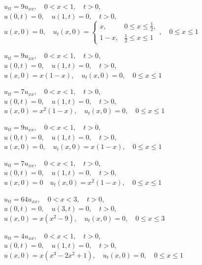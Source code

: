 \begin{exerciselist}



\item\label{exer:12.2.1}$u_{tt}=9u_{xx},\quad 0<x<1,\quad t>0$,\\
$u(0,t)=0,\quad u(1,t)=0,\quad t>0$,\\
$u(x,0)=0,\quad
 u_t(x,0)=
\begin{cases}
x,&0\le x\le\frac{1}{2},\\1-x,&\frac{1}{2}\le x\le1
\end{cases},\quad0\le x\le1$


\item\label{exer:12.2.2}$u_{tt}=9u_{xx},\quad 0<x<1,\quad t>0$,\\
$u(0,t)=0,\quad u(1,t)=0,\quad t>0$,\\
$u(x,0)=x(1-x),\quad u_t(x,0)=0,\quad0\le x\le 1$


\item\label{exer:12.2.3}$u_{tt}=7u_{xx},\quad 0<x<1,\quad t>0$,\\
$u(0,t)=0,\quad u(1,t)=0,\quad t>0$,\\
$u(x,0)=x^2(1-x),\quad u_t(x,0)=0,\quad0\le x\le1$


\item\label{exer:12.2.4}\Cex
$u_{tt}=9u_{xx},\quad 0<x<1,\quad t>0$,\\
$u(0,t)=0,\quad u(1,t)=0,\quad t>0$,\\
$u(x,0)=0,\quad u_t(x,0)=x(1-x),\quad0\le x\le 1$



\item\label{exer:12.2.5}$u_{tt}=7u_{xx},\quad 0<x<1,\quad t>0$,\\
$u(0,t)=0,\quad u(1,t)=0,\quad t>0$,\\
$u(x,0)=0\quad u_t(x,0)=x^2(1-x),\quad0\le x\le1$


\item\label{exer:12.2.6}$u_{tt}=64u_{xx},\quad 0<x<3,\quad t>0$,\\
$u(0,t)=0,\quad u(3,t)=0,\quad t>0$,\\
$u(x,0)=x(x^2-9),\quad u_t(x,0)=0,\quad0\le x\le 3$


\item\label{exer:12.2.7}$u_{tt}=4u_{xx},\quad 0<x<1,\quad t>0$,\\
$u(0,t)=0,\quad u(1,t)=0,\quad t>0$,\\
$u(x,0)=x(x^3-2x^2+1),\quad u_t(x,0)=0,\quad0\le x\le1$



\end{exerciselist}
